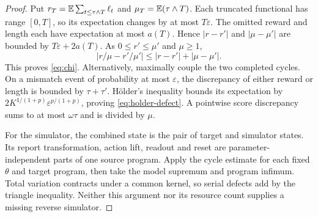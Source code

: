 \begin{proof}
Put $r_T=\mathbb E\sum_{t\le\tau\wedge T}\ell_t$ and $\mu_T=\mathbb E(\tau\wedge T)$. Each truncated functional has range $[0,T]$, so its expectation changes by at most $T\varepsilon$. The omitted reward and length each have expectation at most $a(T)$. Hence $|r-r'|$ and $|\mu-\mu'|$ are bounded by $T\varepsilon+2a(T)$. As $0\le r'\le\mu'$ and $\mu\ge1$,
\[
 |r/\mu-r'/\mu'|\le |r-r'|+|\mu-\mu'|.
\]
This proves \eqref{eq:chi}. Alternatively, maximally couple the two completed cycles. On a mismatch event of probability at most $\varepsilon$, the discrepancy of either reward or length is bounded by $\tau+\tau'$. H\"older's inequality bounds its expectation by $2K^{1/(1+p)}\varepsilon^{p/(1+p)}$, proving \eqref{eq:holder-defect}. A pointwise score discrepancy sums to at most $\omega\tau$ and is divided by $\mu$.

For the simulator, the combined state is the pair of target and simulator states. Its report transformation, action lift, readout and reset are parameter-independent parts of one source program. Apply the cycle estimate for each fixed $\theta$ and target program, then take the model supremum and program infimum. Total variation contracts under a common kernel, so serial defects add by the triangle inequality. Neither this argument nor its resource count supplies a missing reverse simulator.
\end{proof}

